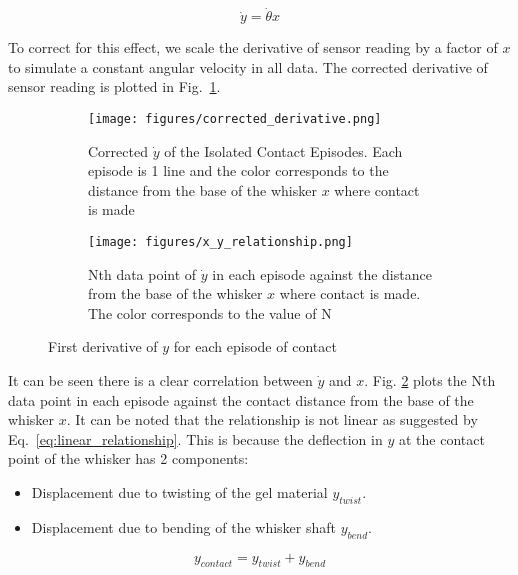 \documentclass[runningheads]{llncs}
\begin{document}
\begin{equation}\label{eq:linear_relationship}
\dot{y} = \dot{\theta}x
\end{equation}

To correct for this effect, we scale the derivative of sensor reading by a factor of \(x\) to simulate a constant angular velocity in all data. The corrected derivative of sensor reading is plotted in Fig.~\ref{fig:corrected_derivative.png}.

\begin{figure}
    \centering
    \begin{subfigure}[t]{.48\textwidth}
        \centering
        \texttt{[image: figures/corrected\_derivative.png]}
        \caption{Corrected \(\dot{y}\) of the Isolated Contact Episodes. Each episode is 1 line and the color corresponds to the distance from the base of the whisker \(x\) where contact is made}
        \label{fig:corrected_derivative.png}
    \end{subfigure}
    \hspace{1mm}
    \begin{subfigure}[t]{.48\textwidth}
        \centering
        \texttt{[image: figures/x\_y\_relationship.png]}
        \caption{Nth data point of \(\dot{y}\) in each episode against the distance from the base of the whisker \(x\) where contact is made. The color corresponds to the value of N}
        \label{fig:x_y_relationship.png}
    \end{subfigure}
    \vspace{-5pt}
    \caption{First derivative of \(y\) for each episode of contact}
    \label{fig:episode_analysis}
\end{figure}

It can be seen there is a clear correlation between \(\dot{y}\) and \(x\). Fig. \ref*{fig:x_y_relationship.png} plots the Nth data point in each episode against the contact distance from the base of the whisker \(x\). It can be noted that the relationship is not linear as suggested by Eq.~\ref*{eq:linear_relationship}. This is because the deflection in \(y\) at the contact point of the whisker has 2 components:
\begin{itemize}
    \item Displacement due to twisting of the gel material \(y_{twist}\).
    \item Displacement due to bending of the whisker shaft \(y_{bend}\).
\end{itemize}
\[y_{contact} = y_{twist} + y_{bend}\]
\end{document}
